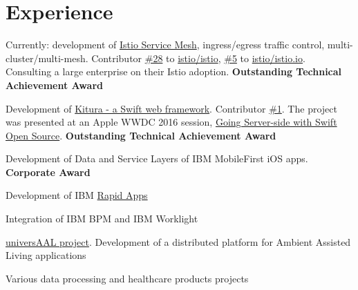 \documentclass[]{deedy-resume}
\begin{document}
\hfill
\begin{minipage}[t]{0.66\textwidth}


\section{Experience}

\vspace{\topsep} %
\begin{tightemize}
\item Currently: development of \href{https://istio.io}{Istio Service Mesh}, ingress/egress traffic control, multi-cluster/multi-mesh.
Contributor \href{https://github.com/istio/istio/graphs/contributors}{\#28} to \href{https://github.com/istio/istio}{istio/istio}, \href{https://github.com/istio/istio.io/graphs/contributors}{\#5} to \href{https://github.com/istio/istio.io}{istio/istio.io}. Consulting a large enterprise on their Istio adoption.
\textbf{Outstanding Technical Achievement Award}
\item Development of \href{https://github.com/IBM-Swift/Kitura}{Kitura - a Swift web framework}. Contributor \href{https://github.com/IBM-Swift/Kitura/graphs/contributors}{\#1}. The project was presented at an Apple WWDC 2016 session, \href{https://developer.apple.com/videos/play/wwdc2016/415/}{Going Server-side with Swift Open Source}. \textbf{Outstanding Technical Achievement Award}
\item Development of Data and Service Layers of IBM MobileFirst iOS apps.  \textbf{Corporate Award}
\item Development of IBM \href{https://www.youtube.com/watch?v=wKHfEx988mc}{Rapid Apps}
\item Integration of IBM BPM and IBM Worklight
\end{tightemize}
\sectionsep

\vspace{\topsep} %
\begin{tightemize}
\item \href{http://universaal.sintef9013.com/index.php/en/}{universAAL project}. Development of a distributed platform for Ambient Assisted Living applications
\item Various data processing and healthcare products projects
\end{tightemize}
\sectionsep


\end{minipage}
\end{document}
